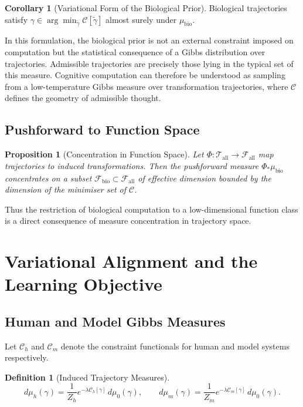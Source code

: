 \documentclass[12pt, a4paper]{article}
\newtheorem{definition}[theorem]{Definition}
\newtheorem{proposition}[theorem]{Proposition}
\theoremstyle{remark}
\theoremstyle{definition}
\newtheorem{corollary}[theorem]{Corollary}
\begin{document}
\begin{corollary}[Variational Form of the Biological Prior]
Biological trajectories satisfy $\gamma \in \arg\min_{\tilde\gamma}\mathcal{C}[\tilde\gamma]$
almost surely under $\mu_{\mathrm{bio}}$.
\end{corollary}

In this formulation, the biological prior is not an external constraint imposed on
computation but the statistical consequence of a Gibbs distribution over trajectories.
Admissible trajectories are precisely those lying in the typical set of this measure.
Cognitive computation can therefore be understood as sampling from a low-temperature
Gibbs measure over transformation trajectories, where $\mathcal{C}$ defines the geometry
of admissible thought.

\subsection{Pushforward to Function Space}

\begin{proposition}[Concentration in Function Space]
\label{prop:fspace_conc}
Let $\Phi\colon\mathcal{T}_{\mathrm{all}}\to\mathcal{F}_{\mathrm{all}}$ map trajectories
to induced transformations.  Then the pushforward measure $\Phi_*\mu_{\mathrm{bio}}$
concentrates on a subset $\mathcal{F}_{\mathrm{bio}} \subset \mathcal{F}_{\mathrm{all}}$
of effective dimension bounded by the dimension of the minimiser set of $\mathcal{C}$.
\end{proposition}

Thus the restriction of biological computation to a low-dimensional function class is a
direct consequence of measure concentration in trajectory space.

\section{Variational Alignment and the Learning Objective}
\label{app:variational}

\subsection{Human and Model Gibbs Measures}

Let $\mathcal{C}_h$ and $\mathcal{C}_m$ denote the constraint functionals for human and
model systems respectively.

\begin{definition}[Induced Trajectory Measures]
\[
d\mu_h(\gamma) = \frac{1}{Z_h}e^{-\lambda\mathcal{C}_h[\gamma]}\,d\mu_0(\gamma),
\qquad
d\mu_m(\gamma) = \frac{1}{Z_m}e^{-\lambda\mathcal{C}_m[\gamma]}\,d\mu_0(\gamma).
\]
\end{definition}
\end{document}
